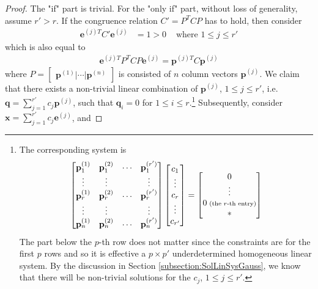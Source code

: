 \begin{proof}
The "if" part is trivial. For the "only if" part, without loss of generality, assume $r' > r$. If the congruence relation $C' = P^TCP$ has to hold, then consider
\begin{align*}
\textbf{e}^{(j)T}C'\textbf{e}^{(j)} &= 1 > 0 & \text{ where $1 \leq j \leq r'$}
\end{align*}
which is also equal to 
\begin{align*}
\textbf{e}^{(j)T}P^TCP\textbf{e}^{(j)} = \textbf{p}^{(j)T}C\textbf{p}^{(j)}
\end{align*}
where $P = \begin{bmatrix}
\textbf{p}^{(1)} | \cdots | \textbf{p}^{(n)}    
\end{bmatrix}$ is consisted of $n$ column vectors $\textbf{p}^{(j)}$. We claim that there exists a non-trivial linear combination of $\textbf{p}^{(j)}$, $1 \leq j \leq r'$, i.e.\ $\textbf{q} = \sum_{j=1}^{r'} c_j\textbf{p}^{(j)}$, such that $\textbf{q}_i = 0$ for $1 \leq i \leq r$.\footnote{The corresponding system is
\begin{align*}
\begin{bmatrix}
\textbf{p}_1^{(1)} & \textbf{p}_1^{(2)} & \cdots & \textbf{p}_1^{(r')} \\
\vdots & \vdots & & \vdots \\
\textbf{p}_r^{(1)} & \textbf{p}_r^{(2)} & \cdots & \textbf{p}_r^{(r')} \\
\vdots & \vdots & & \vdots \\
\textbf{p}_n^{(1)} & \textbf{p}_n^{(2)} & \cdots & \textbf{p}_n^{(r')}
\end{bmatrix}
\begin{bmatrix}
c_1 \\
\vdots \\
c_r \\
\vdots \\
c_{r'}
\end{bmatrix} = 
\begin{bmatrix}
0 \\
\vdots \\
0 {\scriptsize \text{ (the $r$-th entry)}}\\
* 
\end{bmatrix}
\end{align*}
The part below the $p$-th row does not matter since the constraints are for the first $p$ rows and so it is effective a $p \times p'$ underdetermined homogeneous linear system. By the discussion in Section \ref{subsection:SolLinSysGauss}, we know that there will be non-trivial solutions for the $c_j$, $1 \leq j \leq r'$.} Subsequently, consider $\textbf{x} = \sum_{j=1}^{r'} c_j \textbf{e}^{(j)}$, and

\end{proof}
